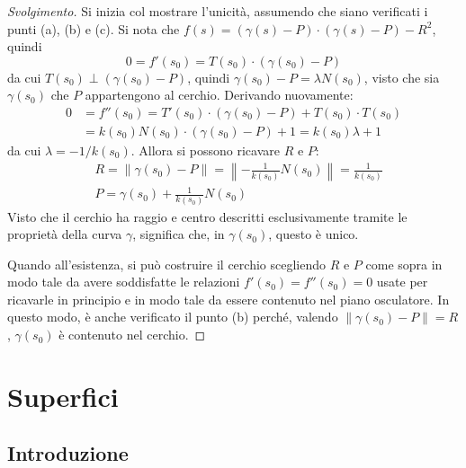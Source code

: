 \documentclass[12pt]{scrartcl}
\theoremstyle{style}
\newenvironment{svolgimento}{\renewcommand\qedsymbol{$\blacksquare$}\begin{proof}[Svolgimento]}{\end{proof}}
\numberwithin{equation}{subsection}
\begin{document}
\begin{svolgimento}
	Si inizia col mostrare l'unicit\`a, assumendo che siano verificati i punti (a), (b) e (c).
	Si nota che $f(s) = (\gamma(s) - P) \cdot (\gamma(s) - P) - R^2$, quindi
	\[
	0=f'(s_0) = T(s_0) \cdot (\gamma(s_0) - P) 
	\] 
	da cui $T(s_0) \perp (\gamma(s_0) - P)$, quindi $\gamma(s_0) - P = \lambda N(s_0)$, visto che sia $\gamma(s_0)$ che $P$ appartengono al cerchio.
	Derivando nuovamente:
	\[
		\begin{split}
			0&=f''(s_0) = T'(s_0) \cdot (\gamma(s_0) - P) + T(s_0) \cdot T(s_0) \\
			 &= k(s_0) N(s_0) \cdot (\gamma(s_0) - P) +1=k(s_0) \lambda +1
		\end{split}
	\] 
	da cui $\lambda =-1/k(s_0)$.
	Allora si possono ricavare $R$ e $P$:
	\[
		\begin{split}
			&R = \left\lVert \gamma(s_0) - P \right\rVert = \left\lVert - \frac{1}{k(s_0)}N(s_0) \right\rVert  = \frac{1}{k(s_0)}\\
			&P = \gamma(s_0) + \frac{1}{k(s_0)}N(s_0)
		\end{split}
	\] 
	Visto che il cerchio ha raggio e centro descritti esclusivamente tramite le propriet\`a della curva $\gamma$, significa che, in $\gamma(s_0)$, questo \`e unico.

	Quando all'esistenza, si pu\`o costruire il cerchio scegliendo $R$ e $P$ come sopra in modo tale da avere soddisfatte le relazioni $f'(s_0) = f''(s_0) =0$ usate per ricavarle in principio e in modo tale da essere contenuto nel piano osculatore.
	In questo modo, \`e anche verificato il punto (b) perch\'e, valendo $\left\lVert \gamma(s_0) - P \right\rVert = R$, $\gamma(s_0)$ \`e contenuto nel cerchio.
\end{svolgimento}

\newpage
\section{Superfici}
\subsection{Introduzione}
\end{document}
